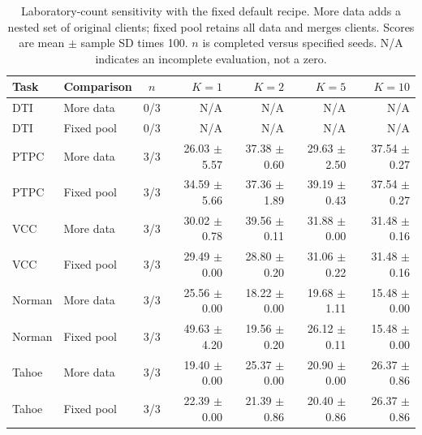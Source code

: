 \begin{table}[htbp]
\centering\small
\setlength{\tabcolsep}{4pt}
\begin{tabularx}{\linewidth}{@{}Xlcrrrr@{}}
\toprule
Task & Comparison & $n$ & $K=1$ & $K=2$ & $K=5$ & $K=10$ \\
\midrule
DTI & More data & 0/3 & N/A & N/A & N/A & N/A \\
DTI & Fixed pool & 0/3 & N/A & N/A & N/A & N/A \\
\midrule
PTPC & More data & 3/3 & 26.03 $\pm$ 5.57 & 37.38 $\pm$ 0.60 & 29.63 $\pm$ 2.50 & 37.54 $\pm$ 0.27 \\
PTPC & Fixed pool & 3/3 & 34.59 $\pm$ 5.66 & 37.36 $\pm$ 1.89 & 39.19 $\pm$ 0.43 & 37.54 $\pm$ 0.27 \\
\midrule
VCC & More data & 3/3 & 30.02 $\pm$ 0.78 & 39.56 $\pm$ 0.11 & 31.88 $\pm$ 0.00 & 31.48 $\pm$ 0.16 \\
VCC & Fixed pool & 3/3 & 29.49 $\pm$ 0.00 & 28.80 $\pm$ 0.20 & 31.06 $\pm$ 0.22 & 31.48 $\pm$ 0.16 \\
\midrule
Norman & More data & 3/3 & 25.56 $\pm$ 0.00 & 18.22 $\pm$ 0.00 & 19.68 $\pm$ 1.11 & 15.48 $\pm$ 0.00 \\
Norman & Fixed pool & 3/3 & 49.63 $\pm$ 4.20 & 19.56 $\pm$ 0.20 & 26.12 $\pm$ 0.11 & 15.48 $\pm$ 0.00 \\
\midrule
Tahoe & More data & 3/3 & 19.40 $\pm$ 0.00 & 25.37 $\pm$ 0.00 & 20.90 $\pm$ 0.00 & 26.37 $\pm$ 0.86 \\
Tahoe & Fixed pool & 3/3 & 22.39 $\pm$ 0.00 & 21.39 $\pm$ 0.86 & 20.40 $\pm$ 0.86 & 26.37 $\pm$ 0.86 \\
\bottomrule
\end{tabularx}
\caption{Laboratory-count sensitivity with the fixed default recipe. More data adds a nested set of original clients; fixed pool retains all data and merges clients. Scores are mean $\pm$ sample SD times 100. $n$ is completed versus specified seeds. N/A indicates an incomplete evaluation, not a zero.}
\label{tab:core-labs}
\end{table}
